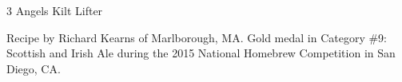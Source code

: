 \stylesection{\styleweeheavy}

\begin{recipe}{3 Angels Kilt Lifter}

\begin{aboutblock}
Recipe by Richard Kearns of Marlborough, MA. Gold medal in Category \#9: Scottish
and Irish Ale during the 2015 National Homebrew Competition in San Diego, CA.
\sourceaha
\end{aboutblock}


\begin{methodandtiming}

\begin{mashsteps}
\end{mashsteps}

\begin{fermentationsteps}
\end{fermentationsteps}

\end{methodandtiming}

\recipebreak

\begin{ingredientsblock}

\begin{malts}
\end{malts}

\begin{hops}
\end{hops}


\end{ingredientsblock}

\end{recipe}

